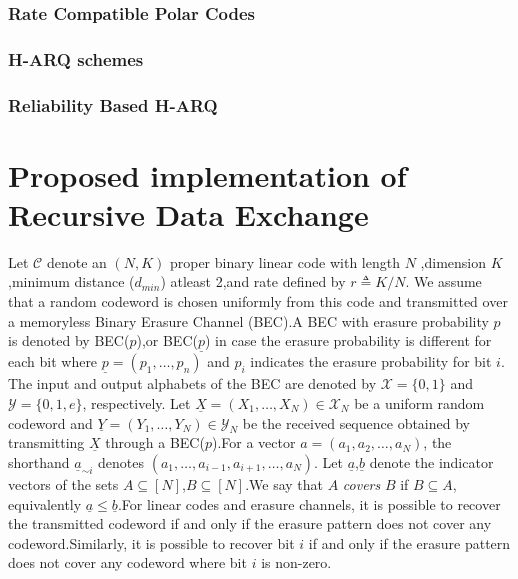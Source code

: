 \documentclass[
11pt, %
a4paper, %
oneside, %
headinclude,footinclude, %
BCOR5mm, %
]{scrartcl}
\begin{document}
\subsubsection*{Rate Compatible Polar Codes}
\subsubsection*{H-ARQ schemes}
\subsubsection*{Reliability Based H-ARQ}


\newpage
\section{Proposed implementation of Recursive Data Exchange} \label{propsol}

Let $\mathcal{C}$ denote an $(N, K)$ proper binary linear code with length $N$ ,dimension $K$ ,minimum distance ($d_{min}$) atleast 2,and rate defined by $r \triangleq K/N$. We assume that a random codeword is chosen uniformly from this code and transmitted over a memoryless Binary Erasure Channel (BEC).A BEC with erasure probability $p$ is denoted by BEC($p$),or BEC($\underline{p}$) in case the erasure probability is different for each bit where $\underline{p} = (p_1 , \ldots , p_n)$ and
$p_i$ indicates the erasure probability for bit $i$.
The input and output alphabets of the BEC are denoted by $\mathcal{X} = \{0, 1\}$ and $\mathcal{Y} = \{0, 1, e\}$, respectively. Let $\underline{X} = (X_1 , \ldots , X_N) \in \mathcal{X}_N$ be a uniform random codeword and
$\underline{Y} = (Y_1 , \ldots, Y_N) \in \mathcal{Y}_N$ be the received sequence obtained by transmitting $\underline{X}$ through a BEC($p$).For a vector $a = (a_1 , a_2 , \ldots , a_N)$, the shorthand $\underline{a}_{\sim i}$ denotes
$(a_1 , \ldots , a_{i-1} , a_{i+1}, \ldots , a_N)$.
Let $\underline{a}$,$\underline{b}$ denote the indicator vectors of the sets $A \subseteq [N]$,$B \subseteq [N]$.We say that $A$ \emph{covers} $B$ if $B \subseteq A$, equivalently  $\underline{a}\leq\underline{b}$.For linear codes and erasure channels, it is possible to recover the transmitted codeword if and only if the erasure
pattern does not cover any codeword.Similarly,
it is possible to recover bit $i$ if and only if the erasure
pattern does not cover any codeword where bit $i$ is non-zero.
\end{document}
